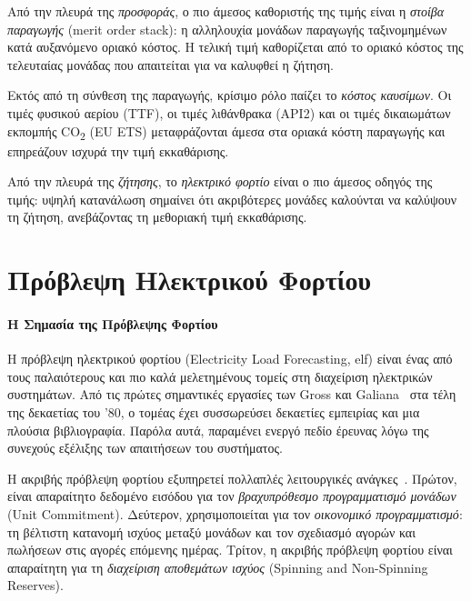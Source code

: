 Από την πλευρά της \textit{προσφοράς}, ο πιο άμεσος καθοριστής της τιμής είναι η
\textit{στοίβα παραγωγής} (merit order stack): η αλληλουχία μονάδων παραγωγής
ταξινομημένων κατά αυξανόμενο οριακό κόστος. Η τελική τιμή καθορίζεται από το
οριακό κόστος της τελευταίας μονάδας που απαιτείται για να καλυφθεί η ζήτηση.

Εκτός από τη σύνθεση της παραγωγής, κρίσιμο ρόλο παίζει το \textit{κόστος καυσίμων}.
Οι τιμές φυσικού αερίου (TTF), οι τιμές λιθάνθρακα (API2) και οι τιμές δικαιωμάτων
εκπομπής CO\textsubscript{2} (EU ETS) μεταφράζονται άμεσα στα οριακά κόστη παραγωγής
και επηρεάζουν ισχυρά την τιμή εκκαθάρισης.

Από την πλευρά της \textit{ζήτησης}, το \textit{ηλεκτρικό φορτίο} είναι ο πιο άμεσος οδηγός της τιμής: υψηλή κατανάλωση σημαίνει ότι ακριβότερες μονάδες καλούνται
να καλύψουν τη ζήτηση, ανεβάζοντας τη μεθοριακή τιμή εκκαθάρισης.


\section{Πρόβλεψη Ηλεκτρικού Φορτίου}
\label{sec:elf_intro}

\paragraph{Η Σημασία της Πρόβλεψης Φορτίου}

Η πρόβλεψη ηλεκτρικού φορτίου (Electricity Load Forecasting, \acrshort{elf}) είναι ένας από τους παλαιότερους και πιο καλά μελετημένους τομείς στη διαχείριση ηλεκτρικών
συστημάτων. Από τις πρώτες σημαντικές εργασίες των Gross και Galiana~\cite{gross1987}
στα τέλη της δεκαετίας του '80, ο τομέας έχει συσσωρεύσει δεκαετίες εμπειρίας και
μια πλούσια βιβλιογραφία. Παρόλα αυτά, παραμένει ενεργό πεδίο έρευνας λόγω της
συνεχούς εξέλιξης των απαιτήσεων του συστήματος.

Η ακριβής πρόβλεψη φορτίου εξυπηρετεί πολλαπλές λειτουργικές ανάγκες~\cite{hong2016}.
Πρώτον, είναι απαραίτητο δεδομένο εισόδου για τον \textit{βραχυπρόθεσμο προγραμματισμό
μονάδων} (Unit Commitment). Δεύτερον, χρησιμοποιείται για τον \textit{οικονομικό
προγραμματισμό}: τη βέλτιστη κατανομή ισχύος μεταξύ μονάδων και τον σχεδιασμό αγορών
και πωλήσεων στις αγορές επόμενης ημέρας. Τρίτον, η ακριβής πρόβλεψη φορτίου είναι
απαραίτητη για τη \textit{διαχείριση αποθεμάτων ισχύος} (Spinning and Non-Spinning
Reserves).

